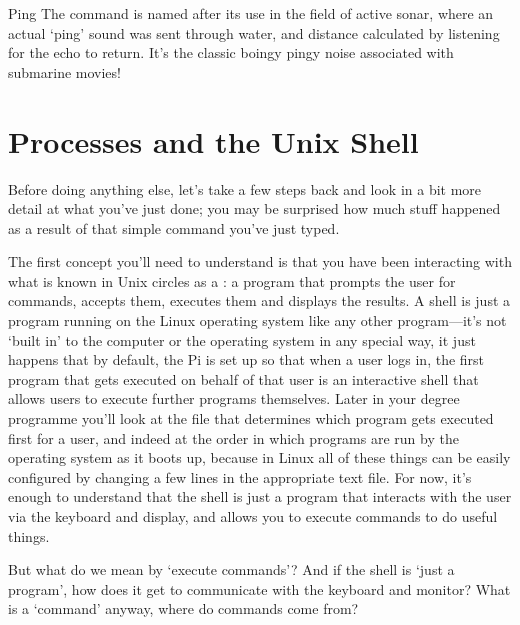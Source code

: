 \begin{diversion}{Ping}
  The  command is named after its use in the field of active sonar, where an actual `ping' sound was sent through water, and distance calculated by listening for the echo to return. It's the classic boingy pingy noise associated with submarine movies! 
\end{diversion}

\section{Processes and the Unix Shell}

Before doing anything else, let's take a few steps back and look in a bit more detail at what you've just done; you may be surprised how much stuff happened as a result of that simple command you've just typed. 

The first concept you'll need to understand is that you have been
interacting with what is known in Unix circles as a : a program that prompts
the user for commands, accepts them, executes them and displays the
results. A shell is just a program running on the Linux operating system like any other program---it's not `built in' to the computer or the operating system in any special way, it just happens that by default, the Pi is set up so that when a user logs in, the first program that gets executed on behalf of that user is an interactive shell that allows users to execute further programs themselves. Later in your degree programme you'll look at the file that determines which program gets executed first for a user, and indeed at the order in which programs are run by the operating system as it boots up, because in Linux all of these things can be easily configured by changing a few lines in the appropriate text file. For now, it's enough to understand that the shell is just a program that interacts with the user via the keyboard and display, and allows you to execute commands to do useful things.

But what do we mean by `execute commands'? And if the shell is `just a program', how does it get to communicate with the keyboard and monitor? What is a `command' anyway, where do commands come from?

